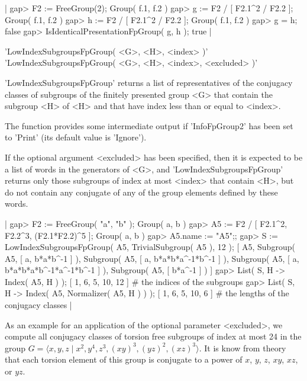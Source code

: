 |    gap> F2 := FreeGroup(2);
    Group( f.1, f.2 )
    gap> g := F2 / [ F2.1^2 / F2.2 ];
    Group( f.1, f.2 )
    gap> h := F2 / [ F2.1^2 / F2.2 ];
    Group( f.1, f.2 )
    gap> g = h;
    false
    gap> IsIdenticalPresentationFpGroup( g, h );
    true |


'LowIndexSubgroupsFpGroup( <G>, <H>, <index> )' \\
'LowIndexSubgroupsFpGroup( <G>, <H>, <index>, <excluded> )'

'LowIndexSubgroupsFpGroup'  returns a  list  of  representatives  of  the
conjugacy classes of  subgroups of the finitely presented  group <G> that
contain the subgroup <H> of <H> and that have index less than or equal to
<index>.

The function provides some intermediate output if 'InfoFpGroup2' has been
set to 'Print' (its default value is 'Ignore').

If the   optional argument  <excluded>  has  been specified, then   it is
expected  to   be a list    of words  in   the  generators  of  <G>,  and
'LowIndexSubgroupsFpGroup' returns only  those subgroups of index at most
<index> that contain <H>,  but do not contain any conjugate of any of the
group elements defined by these words.

|    gap> F2 := FreeGroup( "a", "b" );
    Group( a, b )
    gap> A5 := F2 / [ F2.1^2, F2.2^3, (F2.1*F2.2)^5 ];
    Group( a, b )
    gap> A5.name := "A5";;
    gap> S := LowIndexSubgroupsFpGroup( A5, TrivialSubgroup( A5 ), 12 );
    [ A5, Subgroup( A5, [ a, b*a*b^-1 ] ),
      Subgroup( A5, [ a, b*a*b*a^-1*b^-1 ] ),
      Subgroup( A5, [ a, b*a*b*a*b^-1*a^-1*b^-1 ] ),
      Subgroup( A5, [ b*a^-1 ] ) ]
    gap> List( S, H -> Index( A5, H ) );
    [ 1, 6, 5, 10, 12 ]    # the indices of the subgroups
    gap> List( S, H -> Index( A5, Normalizer( A5, H ) ) );
    [ 1, 6, 5, 10, 6 ]    # the lengths of the conjugacy classes |

As an example for an application of the optional parameter <excluded>, we
compute all conjugacy classes of torsion free  subgroups of index at most
24  in the  group  $G = \langle x,y,z \mid x^2, y^4, z^3, (xy)^3, (yz)^2,
(xz)^3  \rangle$.  It is  know from theory  that  each torsion element of
this group is conjugate to a power of $x$, $y$, $z$, $xy$, $xz$, or $yz$.

